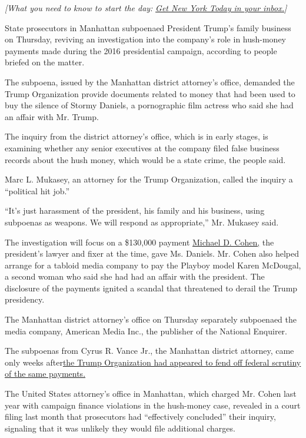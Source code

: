 \emph{{[}What you need to know to start the day:}
\href{https://www.nytimes.com/newsletters/newyorktoday?module=inline}{\emph{Get
New York Today in your inbox.}}\emph{{]}}

State prosecutors in Manhattan subpoenaed President Trump's family
business on Thursday, reviving an investigation into the company's role
in hush-money payments made during the 2016 presidential campaign,
according to people briefed on the matter.

The subpoena, issued by the Manhattan district attorney's office,
demanded the Trump Organization provide documents related to money that
had been used to buy the silence of Stormy Daniels, a pornographic film
actress who said she had an affair with Mr. Trump.

The inquiry from the district attorney's office, which is in early
stages, is examining whether any senior executives at the company filed
false business records about the hush money, which would be a state
crime, the people said.

Marc L. Mukasey, an attorney for the Trump Organization, called the
inquiry a ``political hit job.''

``It's just harassment of the president, his family and his business,
using subpoenas as weapons. We will respond as appropriate,'' Mr.
Mukasey said.

The investigation will focus on a \$130,000 payment
\href{https://www.nytimes.com/2018/12/12/nyregion/michael-cohen-sentence-trump.html?module=inline}{Michael
D. Cohen,} the president's lawyer and fixer at the time, gave Ms.
Daniels. Mr. Cohen also helped arrange for a tabloid media company to
pay the Playboy model Karen McDougal, a second woman who said she had
had an affair with the president. The disclosure of the payments ignited
a scandal that threatened to derail the Trump presidency.

The Manhattan district attorney's office on Thursday separately
subpoenaed the media company, American Media Inc., the publisher of the
National Enquirer.

The subpoenas from Cyrus R. Vance Jr., the Manhattan district attorney,
came only weeks
after\href{https://www.nytimes.com/2019/07/18/nyregion/stormy-daniels-michael-cohen-documents.html}{the
Trump Organization had appeared to fend off federal scrutiny of the same
payments.}

The United States attorney's office in Manhattan, which charged Mr.
Cohen last year with campaign finance violations in the hush-money case,
revealed in a court filing last month that prosecutors had ``effectively
concluded'' their inquiry, signaling that it was unlikely they would
file additional charges.

